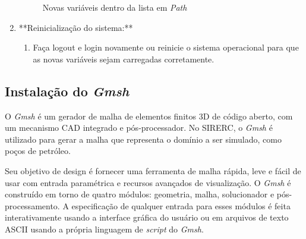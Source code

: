 \documentclass[a4paper,11pt]{article}
\newcommand{\sistema}{\textsf{SIRERC}}
\newcommand{\gmsh}{\textit{Gmsh}}
\begin{document}
\begin{enumerate}
	\begin{figure}[H]\centering
		\caption{Novas variáveis dentro da lista em \emph{Path}}\label{fig:vtkdirpath}
	\end{figure}
	
	\item **Reinicialização do sistema:**
	\begin{enumerate}
		\item Faça logout e login novamente ou reinicie o sistema operacional para que as novas variáveis sejam carregadas corretamente.
	\end{enumerate}
\end{enumerate}

\subsection{Instalação do \gmsh{}}

O \gmsh{} é um gerador de malha de elementos finitos 3D de código aberto, com um mecanismo CAD integrado e pós-processador. No \sistema{}, o \gmsh{} é utilizado para gerar a malha que representa o domínio a ser simulado, como poços de petróleo.

Seu objetivo de design é fornecer uma ferramenta de malha rápida, leve e fácil de usar com entrada paramétrica e recursos avançados de visualização. O \gmsh{} é construído em torno de quatro módulos: geometria, malha, solucionador e pós-processamento. A especificação de qualquer entrada para esses módulos é feita interativamente usando a interface gráfica do usuário ou em arquivos de texto ASCII usando a própria linguagem de \textit{script} do \gmsh{}.
\end{document}
